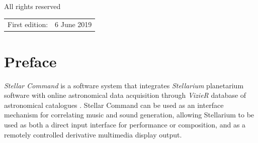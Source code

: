 \documentclass[10pt,a4paper,extrafontsizes]{memoir}
\newif\ifMASTER
\newcommand\svnidlong[4]{}
\begin{document}
All rights reserved



\begin{center}
\begin{tabular}{ll}
First edition:                        & 6 June 2019 \\

\end{tabular}
\end{center}
\ifMASTER
Manual last changed \svnyear/\svnmonth/\svnday
\fi

\endgroup

\clearpage

\pagestyle{headings}

\setupshorttoc
\tableofcontents
\clearpage
\setupparasubsecs
\setupmaintoc

\begingroup

%




\tableofcontents

\endgroup


\setlength{\unitlength}{1pt}
\clearpage
\listoffigures
\clearpage
\listoftables
\clearpage
\listofegresults




\svnidlong
{$Ignore: $}
{$LastChangedDate: 2014-11-05 16:28:11 +0100 (Wed, 05 Nov 2014) $}
{$LastChangedRevision: 501 $}
{$LastChangedBy: daleif $}

\chapter{Preface}
    
    \textit{Stellar Command} is a software system that integrates \textit{Stellarium} planetarium software with online astronomical data acquisition through \textit{VizieR} database of astronomical catalogues \cite{ochsenbein2000vizier}. Stellar Command can be used as an interface mechanism for correlating music and sound generation, allowing Stellarium to be used as both a direct input interface for performance or composition, and as a remotely controlled derivative multimedia display output.   
\end{document}
